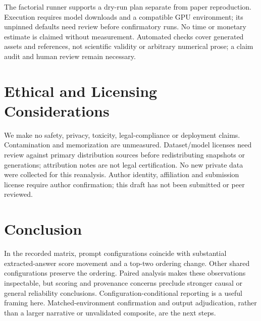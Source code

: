 The factorial runner supports a dry-run plan separate from paper reproduction. Execution requires model downloads and a compatible GPU environment; its unpinned defaults need review before confirmatory runs. No time or monetary estimate is claimed without measurement. Automated checks cover generated assets and references, not scientific validity or arbitrary numerical prose; a claim audit and human review remain necessary.

\section{Ethical and Licensing Considerations}
We make no safety, privacy, toxicity, legal-compliance or deployment claims. Contamination and memorization are unmeasured. Dataset/model licenses need review against primary distribution sources before redistributing snapshots or generations; attribution notes are not legal certification. No new private data were collected for this reanalysis. Author identity, affiliation and submission license require author confirmation; this draft has not been submitted or peer reviewed.

\section{Conclusion}
In the recorded matrix, prompt configurations coincide with substantial extracted-answer score movement and a top-two ordering change. Other shared configurations preserve the ordering. Paired analysis makes these observations inspectable, but scoring and provenance concerns preclude stronger causal or general reliability conclusions. Configuration-conditional reporting is a useful framing here. Matched-environment confirmation and output adjudication, rather than a larger narrative or unvalidated composite, are the next steps.
